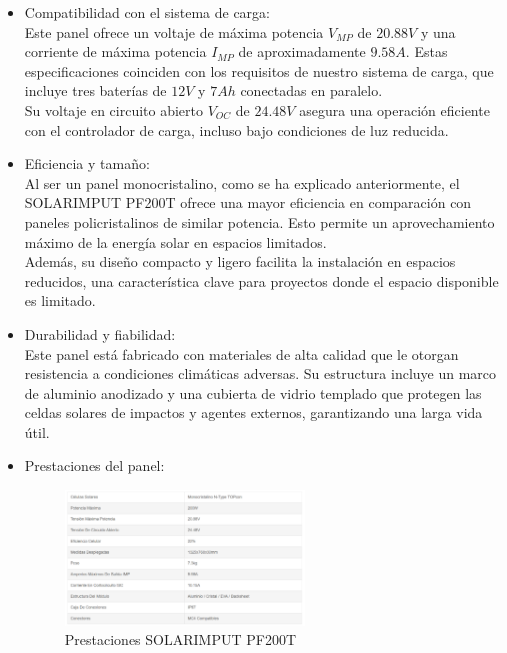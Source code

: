 \begin{itemize}
    \item Compatibilidad con el sistema de carga: \\
    Este panel ofrece un voltaje de máxima potencia $V_{MP}$ de $20.88 V$ y una corriente de máxima potencia $I_{MP}$  de aproximadamente $9.58 A$. Estas especificaciones coinciden con los requisitos de nuestro sistema de carga, que incluye tres baterías de $12 V$ y $7 Ah$ conectadas en paralelo. \\
    Su voltaje en circuito abierto $V_{OC}$  de $24.48 V$ asegura una operación eficiente con el controlador de carga, incluso bajo condiciones de luz reducida.

    \item Eficiencia y tamaño: \\
    Al ser un panel monocristalino, como se ha explicado anteriormente, el SOLARIMPUT PF200T ofrece una mayor eficiencia en comparación con paneles policristalinos de similar potencia. Esto permite un aprovechamiento máximo de la energía solar en espacios limitados.\\
    Además, su diseño compacto y ligero facilita la instalación en espacios reducidos, una característica clave para proyectos donde el espacio disponible es limitado.

    \item Durabilidad y fiabilidad:\\
    Este panel está fabricado con materiales de alta calidad que le otorgan resistencia a condiciones climáticas adversas. Su estructura incluye un marco de aluminio anodizado y una cubierta de vidrio templado que protegen las celdas solares de impactos y agentes externos, garantizando una larga vida útil.

    \item Prestaciones del panel:
    \begin{figure}[H]
        \centering
        \includegraphics[width=0.6\textwidth]{images/2-hardware/Panel Solar/Caracteristicas.png}
        \caption{Prestaciones SOLARIMPUT PF200T}
        \label{fig:4-1-1-PanelSolar}
    \end{figure}
\end{itemize}


